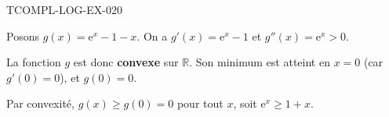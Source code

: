 \begin{corrige}{TCOMPL-LOG-EX-020}


Posons $g(x) = \mathrm{e}^x - 1 - x$. On a $g'(x) = \mathrm{e}^x - 1$ et $g''(x) = \mathrm{e}^x > 0$.

La fonction $g$ est donc \textbf{convexe} sur $\mathbb{R}$. Son minimum est atteint en $x=0$ (car $g'(0)=0$), et $g(0) = 0$.

Par convexité, $g(x) \geq g(0) = 0$ pour tout $x$, soit $\mathrm{e}^x \geq 1 + x$.

\end{corrige}
